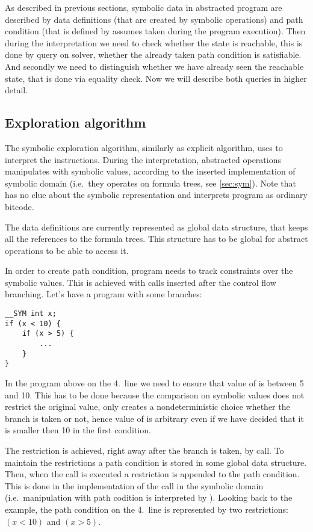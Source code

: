 As described in previous sections, symbolic data in abstracted program are
described by data definitions (that are created by symbolic operations) and
path condition (that is defined by assumes taken during the program execution).
Then during the interpretation we need to check whether the state is
reachable, this is done by query on \SMT solver, whether the already taken
path condition is satisfiable. And secondly we need to distinguish whether we
have already seen the reachable state, that is done via equality check. Now we will
describe both queries in higher detail.

\subsection{Exploration algorithm}
The symbolic exploration algorithm, similarly as explicit algorithm, uses \DIVM
to interpret the \LLVM instructions. During the interpretation, abstracted
operations manipulates with symbolic values, according to the inserted implementation of
symbolic domain (i.e.~they operates on formula trees, see \autoref{sec:sym}).
Note that \DIVM has no clue about the symbolic representation and interprets
program as ordinary \LLVM bitcode.

The data definitions are currently represented as global data structure, that
keeps all the references to the formula trees. This structure has to be global
for abstract operations to be able to access it.

In order to create path condition, program needs to track constraints over the
symbolic values. This is achieved with  calls inserted after the
control flow branching. Let's have a program with some branches:
\begin{verbatim}
__SYM int x;
if (x < 10) {
    if (x > 5) {
        ...
    }
}
\end{verbatim}
In the program above on the 4.~line we need to ensure that value of  is
between 5 and 10. This has to be done because the comparison on symbolic values
does not restrict the original value, only creates a nondeterministic choice
whether the branch is taken or not, hence value of  is arbitrary even if
we have decided that it is smaller then 10 in the first condition.

The restriction is achieved, right away after the branch is taken, by
 call. To maintain the restrictions a path condition is stored in
some global data structure. Then, when the  call is executed a
restriction is appended to the path condition. This is done in the
implementation of the  call in the symbolic domain
(i.e.~manipulation with path codition is interpreted by \DIVM). Looking back to
the example, the path condition on the 4.~line is represented by two
restrictions: $(x < 10)$ and $(x > 5)$.

